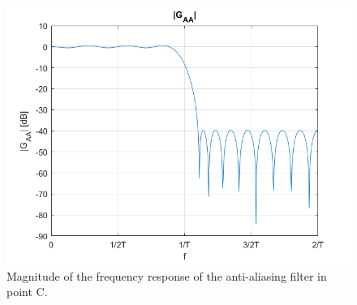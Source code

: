 \documentclass[a4paper,11.5pt]{article}
\begin{document}
\begin{figure}[ht]
	\begin{center}   
		\includegraphics[width=\textwidth]{figs/GAA.png} 
		\caption{Magnitude of the frequency response of the anti-aliasing filter in point C.}
		\label{fig:C_gaa}
	\end{center}
\end{figure}
\end{document}
